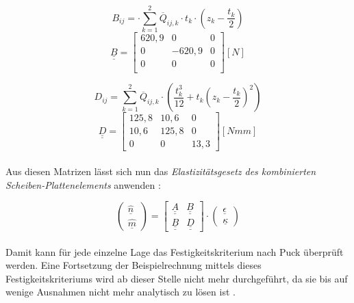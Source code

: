\begin{equation}
	B_{ij}= \cdot \sum_{k=1}^{2} \overline{Q}_{ij,k}\cdot t_{k}\cdot \left(z_{k}-\frac{t_{k}}{2}\right)
\end{equation}
\begin{equation} \underline{\underline{B}}=
	\begin{bmatrix}
		620,9 & 0 & 0\\
		0 & -620,9 & 0\\	
		0 & 0 & 0\\
	\end{bmatrix} [N]
\end{equation}

\begin{equation} 
	D_{ij}=\sum_{k=1}^{2} \overline{Q}_{ij,k}\cdot \left(\frac{t_{k}^{3}}{12}+t_{k}\left(z_{k}-\frac{t_{k}}{2}\right)^{2}\right)
\end{equation}
\begin{equation}\underline{\underline{D}}=
	\begin{bmatrix}
		125,8 & 10,6 & 0\\
		10,6 & 125,8 & 0\\
		0 & 0 & 13,3
	\end{bmatrix} [Nmm]
\end{equation}\\

\noindent Aus diesen Matrizen lässt sich nun das \textit{ Elastizitätsgesetz des kombinierten Scheiben-Plattenelements} anwenden \cite{item3}:

\begin{equation}
	\begin{pmatrix}
		\hat{\underline{n}}\\
		\hat{\underline{m}}
	\end{pmatrix}
	= \begin{bmatrix}
		\underline{\underline{A}}&\underline{\underline{B}}\\
		\underline{\underline{B}}&\underline{\underline{D}}
	\end{bmatrix}
	\cdot \begin{pmatrix}
		\underline{\epsilon}\\
		\underline{\kappa}
	\end{pmatrix}
\end{equation}\\

\noindent Damit kann für jede einzelne Lage das Festigkeitskriterium nach Puck überprüft werden. Eine Fortsetzung der Beispielrechnung mittels dieses Festigkeitskriteriums wird ab dieser Stelle nicht mehr durchgeführt, da sie bis auf wenige Ausnahmen nicht mehr analytisch zu lösen ist \cite{item3}.\\

